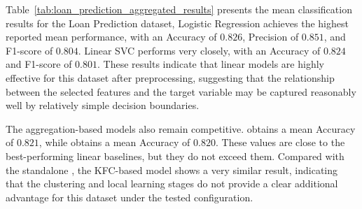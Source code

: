 \begin{table}[H]
    \centering
    \caption{Mean Loan Prediction Classification Results}
    \label{tab:loan_prediction_aggregated_results}
    \small
\end{table}

\hs Table~\ref{tab:loan_prediction_aggregated_results} presents the mean classification results for the Loan Prediction dataset, Logistic Regression achieves the highest reported mean performance, with an Accuracy of $0.826$, Precision of $0.851$, and F1-score of $0.804$. Linear SVC performs very closely, with an Accuracy of $0.824$ and F1-score of $0.801$. These results indicate that linear models are highly effective for this dataset after preprocessing, suggesting that the relationship between the selected features and the target variable may be captured reasonably well by relatively simple decision boundaries.

The aggregation-based models also remain competitive.  obtains a mean Accuracy of $0.821$, while  obtains a mean Accuracy of $0.820$. These values are close to the best-performing linear baselines, but they do not exceed them. Compared with the standalone , the KFC-based model shows a very similar result, indicating that the clustering and local learning stages do not provide a clear additional advantage for this dataset under the tested configuration.

